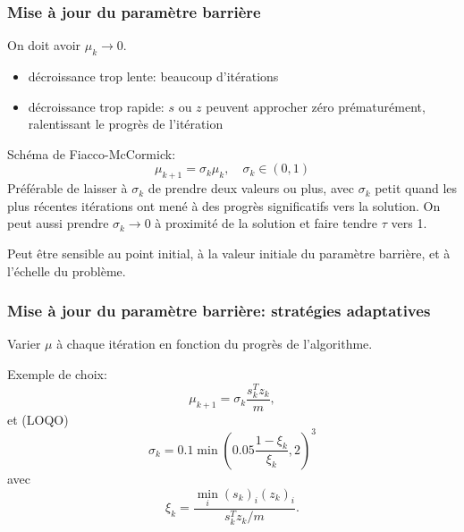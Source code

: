 \documentclass[usepdftitle=false,aspectratio=169]{beamer}
\begin{document}
\begin{frame}
\frametitle{Mise à jour du paramètre barrière}

On doit avoir $\mu_k \rightarrow 0$.
\begin{itemize}
	\item décroissance trop lente: beaucoup d'itérations
	\item décroissance trop rapide: $s$ ou $z$ peuvent approcher zéro prématurément, ralentissant le progrès de l'itération
\end{itemize}

\mbox{}

Schéma de Fiacco-McCormick:
$$
\mu_{k+1} = \sigma_k\mu_k, \quad \sigma_k \in (0,1)
$$
Préférable de laisser à $\sigma_k$ de prendre deux valeurs ou plus, avec $\sigma_k$ petit quand les plus récentes itérations ont mené à des progrès significatifs vers la solution.
On peut aussi prendre $\sigma_k \rightarrow 0$ à proximité de la solution et faire tendre $\tau$ vers 1.

\mbox{}

Peut être sensible au point initial, à la valeur initiale du paramètre barrière, et à l'échelle du problème.

\end{frame}

\begin{frame}
\frametitle{Mise à jour du paramètre barrière: stratégies adaptatives}

Varier $\mu$ à chaque itération en fonction du progrès de l'algorithme.

\mbox{}

Exemple de choix:
$$
\mu_{k+1} = \sigma_k \frac{s_k^Tz_k}{m},
$$
et (LOQO)
$$
\sigma_k = 0.1 \min \left( 0.05 \frac{1-\xi_k}{\xi_k}, 2\right)^3
$$
avec
$$
\xi_k = \frac{\min_i (s_k)_i(z_k)_i}{s_k^Tz_k/m}.
$$
\end{frame}
\end{document}
